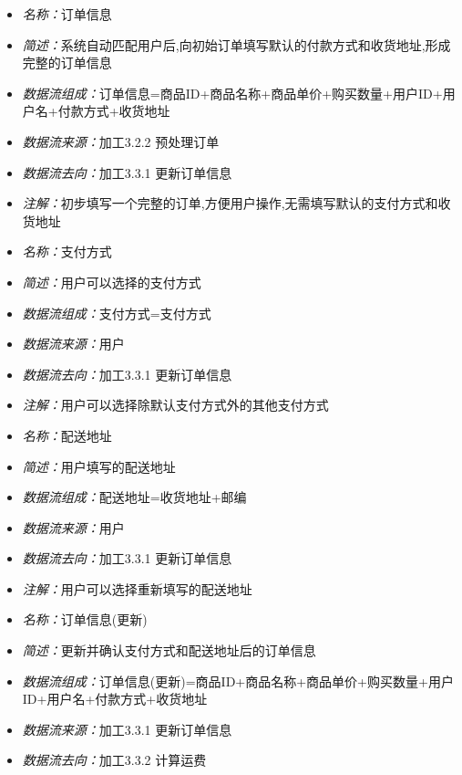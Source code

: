 \documentclass{article}
\begin{document}
\begin{CJK*}{UTF8}{gbsn}
\vspace{-1mm}

\begin{itemize}
	\item \textit{名称：}订单信息
	\item \textit{简述：}系统自动匹配用户后,向初始订单填写默认的付款方式和收货地址,形成完整的订单信息
	\item \textit{数据流组成：}订单信息=商品ID+商品名称+商品单价+购买数量+用户ID+用户名+付款方式+收货地址
	\item \textit{数据流来源：}加工3.2.2 预处理订单
	\item \textit{数据流去向：}加工3.3.1 更新订单信息
	\item \textit{注解：}初步填写一个完整的订单,方便用户操作,无需填写默认的支付方式和收货地址
\end{itemize}

\vspace{-1mm}

\begin{itemize}
	\item \textit{名称：}支付方式
	\item \textit{简述：}用户可以选择的支付方式
	\item \textit{数据流组成：}支付方式=支付方式
	\item \textit{数据流来源：}用户
	\item \textit{数据流去向：}加工3.3.1 更新订单信息
	\item \textit{注解：}用户可以选择除默认支付方式外的其他支付方式
\end{itemize}

\vspace{-1mm}

\begin{itemize}
	\item \textit{名称：}配送地址
	\item \textit{简述：}用户填写的配送地址
	\item \textit{数据流组成：}配送地址=收货地址+邮编
	\item \textit{数据流来源：}用户
	\item \textit{数据流去向：}加工3.3.1 更新订单信息
	\item \textit{注解：}用户可以选择重新填写的配送地址
\end{itemize}

\vspace{-1mm}

\begin{itemize}
	\item \textit{名称：}订单信息(更新)
	\item \textit{简述：}更新并确认支付方式和配送地址后的订单信息
	\item \textit{数据流组成：}订单信息(更新)=商品ID+商品名称+商品单价+购买数量+用户ID+用户名+付款方式+收货地址
	\item \textit{数据流来源：}加工3.3.1 更新订单信息
	\item \textit{数据流去向：}加工3.3.2 计算运费
\end{itemize}


\end{CJK*}
\end{document}

